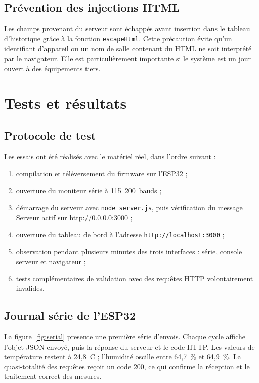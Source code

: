 \documentclass[11pt,a4paper]{article}
\begin{document}
\subsection{Prévention des injections HTML}

Les champs provenant du serveur sont échappés avant insertion dans le tableau d'historique
grâce à la fonction \texttt{escapeHtml}. Cette précaution évite qu'un identifiant d'appareil
ou un nom de salle contenant du HTML ne soit interprété par le navigateur. Elle est
particulièrement importante si le système est un jour ouvert à des équipements tiers.

\section{Tests et résultats}

\subsection{Protocole de test}

Les essais ont été réalisés avec le matériel réel, dans l'ordre suivant :

\begin{enumerate}
  \item compilation et téléversement du firmware sur l'ESP32 ;
  \item ouverture du moniteur série à 115~200~bauds ;
  \item démarrage du serveur avec \texttt{node server.js}, puis vérification du message
        \og Serveur actif sur http://0.0.0.0:3000 \fg{} ;
  \item ouverture du tableau de bord à l'adresse \texttt{http://localhost:3000} ;
  \item observation pendant plusieurs minutes des trois interfaces : série, console serveur
        et navigateur ;
  \item tests complémentaires de validation avec des requêtes HTTP volontairement invalides.
\end{enumerate}

\subsection{Journal série de l'ESP32}

La figure~\ref{fig:serial} presente une première série d'envois. Chaque cycle affiche l'objet
JSON envoyé, puis la réponse du serveur et le code HTTP. Les valeurs de température restent à
24,8~\textdegree C ; l'humidité oscille entre 64,7~\% et 64,9~\%. La quasi-totalité des requêtes
reçoit un code 200, ce qui confirme la réception et le traitement correct des mesures.
\end{document}
